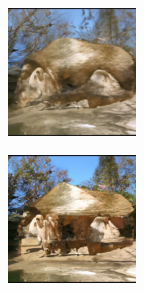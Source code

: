 \documentclass{article}
\begin{document}
\begin{figure}
    \begin{subfigure}[b]{0.5\linewidth}
        \begin{subfigure}[b]{0.242\linewidth}
        \includegraphics[width=\linewidth]{figures/imagenet128/solver_samples/imagenet128_fm_ot_99_05.png}
        \end{subfigure}%
        \begin{subfigure}[b]{0.242\linewidth}
        \includegraphics[width=\linewidth]{figures/imagenet128/solver_samples/imagenet128_fm_ot_99_10.png}

\end{subfigure}
\end{subfigure}
\end{figure}
\end{document}
